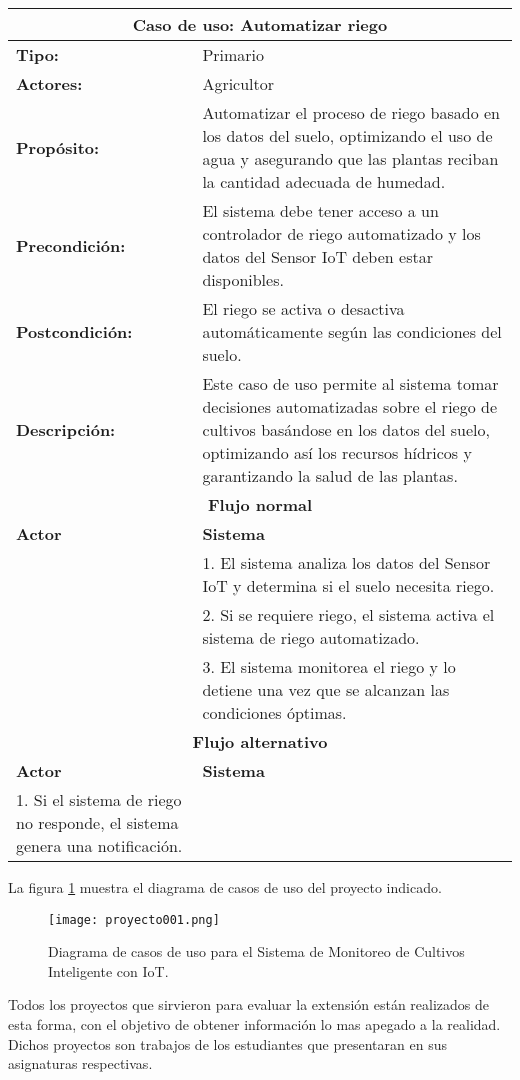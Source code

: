 \begin{longtable}{|p{5cm}|p{5cm}|}
	\hline
	\multicolumn{2}{|c|}{\textbf{Caso de uso: Automatizar riego}} \\
	\hline
	\textbf{Tipo:} & Primario \\
	\hline
	\textbf{Actores:} & Agricultor \\
	\hline
	\textbf{Propósito:} & Automatizar el proceso de riego basado en los datos del suelo, optimizando el uso de agua y asegurando que las plantas reciban la cantidad adecuada de humedad. \\
	\hline
	\textbf{Precondición:} & El sistema debe tener acceso a un controlador de riego automatizado y los datos del Sensor IoT deben estar disponibles. \\
	\hline
	\textbf{Postcondición:} & El riego se activa o desactiva automáticamente según las condiciones del suelo. \\
	\hline
	\textbf{Descripción:} & Este caso de uso permite al sistema tomar decisiones automatizadas sobre el riego de cultivos basándose en los datos del suelo, optimizando así los recursos hídricos y garantizando la salud de las plantas. \\
	\hline
	\multicolumn{2}{|c|}{\textbf{Flujo normal}} \\
	\hline
	\textbf{Actor} & \textbf{Sistema} \\
	\hline
	& 1. El sistema analiza los datos del Sensor IoT y determina si el suelo necesita riego. \\
	\hline
	& 2. Si se requiere riego, el sistema activa el sistema de riego automatizado. \\
	\hline
	& 3. El sistema monitorea el riego y lo detiene una vez que se alcanzan las condiciones óptimas. \\
	\hline
	\multicolumn{2}{|c|}{\textbf{Flujo alternativo}} \\
	\hline
	\textbf{Actor} & \textbf{Sistema} \\
	\hline
	1. Si el sistema de riego no responde, el sistema genera una notificación. & \\
	\hline
\end{longtable}

La figura \ref{fig:cap3_proyecto_001} muestra el diagrama de casos de uso del proyecto indicado.

 \begin{figure}[H]  
	\centering
	\texttt{[image: proyecto001.png]} 
	\caption{Diagrama de casos de uso para el Sistema de Monitoreo de Cultivos Inteligente con IoT.}
	\label{fig:cap3_proyecto_001}
\end{figure}

Todos los proyectos que sirvieron para evaluar la extensión están realizados de esta forma, con el objetivo de obtener información lo mas apegado a la realidad. Dichos proyectos son trabajos de los estudiantes que presentaran en sus asignaturas respectivas.